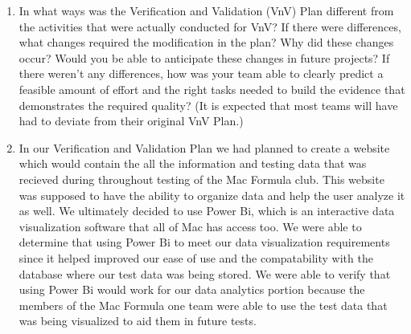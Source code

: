 \documentclass[12pt, titlepage]{article}
\begin{document}
\begin{enumerate}
  \item In what ways was the Verification and Validation (VnV) Plan different
  from the activities that were actually conducted for VnV?  If there were
  differences, what changes required the modification in the plan?  Why did
  these changes occur?  Would you be able to anticipate these changes in future
  projects?  If there weren't any differences, how was your team able to clearly
  predict a feasible amount of effort and the right tasks needed to build the
  evidence that demonstrates the required quality?  (It is expected that most
  teams will have had to deviate from their original VnV Plan.)

  \item In our Verification and Validation Plan we had planned to create a website which would contain the all the information and testing data that was recieved during throughout testing of the Mac Formula club. This website was supposed to have the ability to organize data and help the user analyze it as well. We ultimately decided to use Power Bi, which is an interactive data visualization software that all of Mac has access too. We were able to determine that using Power Bi to meet our data visualization requirements since it helped improved our ease of use and the compatability with the database where our test data was being stored. We were able to verify that using Power Bi would work for our data analytics portion because the members of the Mac Formula one team were able to use the test data that was being visualized to aid them in future tests.

\end{enumerate}
\end{document}
